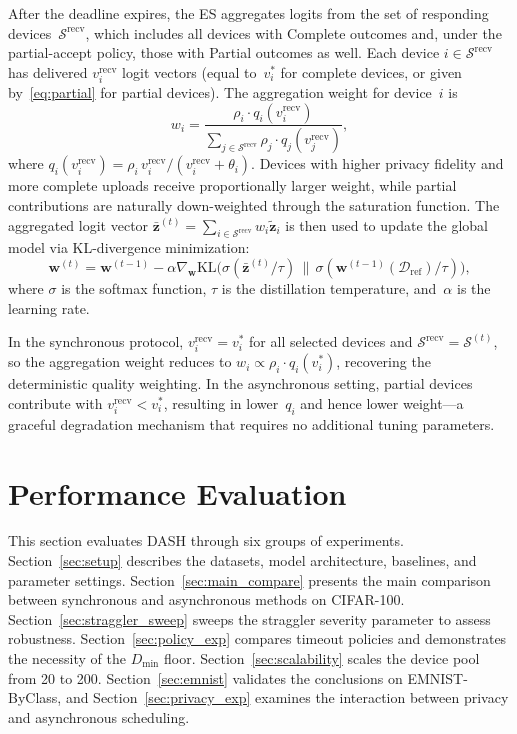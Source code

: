 \documentclass[a4paper,fleqn]{cas-dc}
\newcommand{\Dref}{\mathcal{D}_{\mathrm{ref}}}
\newcommand{\Sset}{\mathcal{S}}
\newcommand{\Srecv}{\mathcal{S}^{\mathrm{recv}}}
\begin{document}
	After the deadline expires, the ES aggregates logits from the
	set of responding devices~$\Srecv$, which includes all devices with
	Complete outcomes and, under the partial-accept policy, those with
	Partial outcomes as well.  Each device $i \in \Srecv$ has delivered
	$v_i^{\mathrm{recv}}$ logit vectors (equal to~$v_i^*$ for complete
	devices, or given by~\eqref{eq:partial} for partial devices).  The
	aggregation weight for device~$i$ is
	\begin{equation}\label{eq:agg_weight}
		w_i = \frac{\rho_i \cdot q_i(v_i^{\mathrm{recv}})}
		{\displaystyle\sum_{j \in \Srecv}
			\rho_j \cdot q_j(v_j^{\mathrm{recv}})},
	\end{equation}
	where $q_i(v_i^{\mathrm{recv}}) =
	\rho_i \, v_i^{\mathrm{recv}} / (v_i^{\mathrm{recv}} + \theta_i)$.
	Devices with higher privacy fidelity and more complete uploads
	receive proportionally larger weight, while partial contributions are
	naturally down-weighted through the saturation function.  The
	aggregated logit vector
	$\bar{\mathbf{z}}^{(t)} = \sum_{i \in \Srecv}
	w_i \tilde{\mathbf{z}}_i$
	is then used to update the global model via KL-divergence
	minimization:
	\begin{equation}\label{eq:kl}
		\mathbf{w}^{(t)} \!=\! \mathbf{w}^{(t-1)}
		\!-\! \alpha \nabla_{\mathbf{w}}
		\mathrm{KL}\!\bigl(
		\sigma(\bar{\mathbf{z}}^{(t)} / \tau)
		\,\|\,
		\sigma(\mathbf{w}^{(t-1)}\!(\Dref) / \tau)
		\bigr),
	\end{equation}
	where $\sigma$ is the softmax function, $\tau$ is the distillation
	temperature, and~$\alpha$ is the learning rate.
	
	In the synchronous protocol, $v_i^{\mathrm{recv}} = v_i^*$ for all
	selected devices and $\Srecv = \Sset^{(t)}$, so the aggregation
	weight reduces to $w_i \propto \rho_i \cdot q_i(v_i^*)$, recovering
	the deterministic quality weighting.  In the asynchronous setting,
	partial devices contribute with $v_i^{\mathrm{recv}} < v_i^*$,
	resulting in lower~$q_i$ and hence lower weight---a graceful
	degradation mechanism that requires no additional tuning parameters.
	
	
	\section{Performance Evaluation}\label{sec:eval}
	
	This section evaluates DASH through six groups of experiments.
	Section~\ref{sec:setup} describes the datasets, model architecture,
	baselines, and parameter settings.
	Section~\ref{sec:main_compare} presents the main comparison between
	synchronous and asynchronous methods on CIFAR-100.
	Section~\ref{sec:straggler_sweep} sweeps the straggler severity
	parameter to assess robustness.
	Section~\ref{sec:policy_exp} compares timeout policies and
	demonstrates the necessity of the $D_{\min}$ floor.
	Section~\ref{sec:scalability} scales the device pool from 20 to 200.
	Section~\ref{sec:emnist} validates the conclusions on EMNIST-ByClass,
	and Section~\ref{sec:privacy_exp} examines the interaction between
	privacy and asynchronous scheduling.
	
\end{document}
